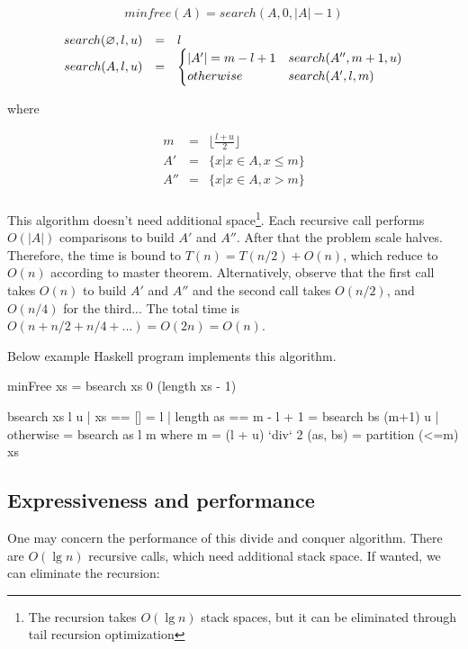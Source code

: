 \documentclass[b5paper]{article}
\begin{document}
\[
minfree(A) = search(A, 0, |A|-1)
\]

\[
\begin{array}{rcl}
search(\varnothing, l, u) & = & l \\
search(A, l, u) & = & \begin{cases}
       |A'| = m - l + 1 & search(A'', m+1, u) \\
       otherwise & search(A',  l, m) \\
\end{cases}
\end{array}
\]

where

\[ \begin{array}{rcl}
m & = & \displaystyle \lfloor \frac{l+u}{2} \rfloor \\
A' & = & \{ x | x \in A, x \leq m \} \\
A''& = & \{ x | x \in A, x > m \} \\
\end{array} \]

This algorithm doesn't need additional space\footnote{The recursion takes $O(\lg n)$ stack spaces, but it can be eliminated through tail recursion optimization}. Each recursive call performs $O(|A|)$ comparisons to build $A'$ and $A''$. After that the problem scale halves. Therefore, the time is bound to $T(n) = T(n/2) + O(n)$, which reduce to $O(n)$ according to master theorem. Alternatively, observe that the first call takes $O(n)$ to build $A'$ and $A''$ and the second call takes $O(n/2)$, and $O(n/4)$ for the third... The total time is $O(n + n/2 + n/4 + ...) = O(2n) = O(n)$.

Below example Haskell program implements this algorithm.

\begin{Haskell}
minFree xs = bsearch xs 0 (length xs - 1)

bsearch xs l u | xs == [] = l
               | length as == m - l + 1 = bsearch bs (m+1) u
               | otherwise = bsearch as l m
    where
      m = (l + u) `div` 2
      (as, bs) = partition (<=m) xs
\end{Haskell}

\subsection{Expressiveness and performance}
One may concern the performance of this divide and conquer algorithm. There are $O(\lg n)$ recursive calls, which need additional stack space. If wanted, we can eliminate the recursion:
\end{document}
